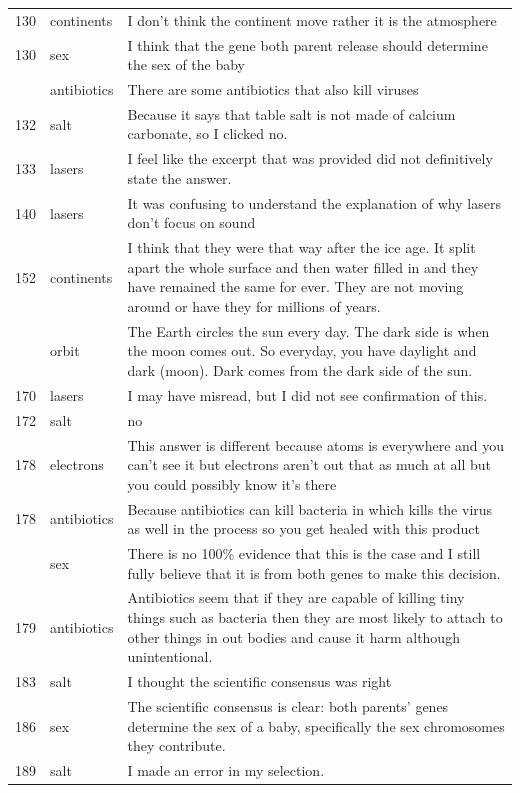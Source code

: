 \documentclass[
  doc,floatsintext]{apa6}
\begin{document}
\begin{longtable}[t]{>{}r>{}l>{\raggedright\arraybackslash}p{30em}}
130 & continents & I don't think the continent move rather it is the atmosphere\\
130 & sex & I think that the gene both parent release should determine the sex of the baby\\
\addlinespace
131 & antibiotics & There are some antibiotics that also kill viruses\\
132 & salt & Because it says that table salt is not made of calcium carbonate, so I clicked no.\\
133 & lasers & I feel like the excerpt that was provided did not definitively state the answer.\\
140 & lasers & It was confusing to understand the explanation of why lasers don’t focus on sound\\
152 & continents & I think that they were that way after the ice age.  It split apart the whole surface and then water filled in and they have remained the same for ever.  They are not moving around or have they for millions of years.\\
\addlinespace
152 & orbit & The  Earth circles the sun every day.  The dark side is when the moon comes out.  So everyday, you have daylight and dark (moon).  Dark comes from the dark side of the sun.\\
170 & lasers & I may have misread, but I did not see confirmation of this.\\
172 & salt & no\\
178 & electrons & This answer is different because atoms is everywhere and you can't see it but electrons aren't out that as much at all but you could possibly know it's there\\
178 & antibiotics & Because antibiotics can kill bacteria in which kills the virus as well in the process so you get healed with this product\\
\addlinespace
178 & sex & There is no 100\% evidence that this is the case and I still fully believe that it is from both genes to make this decision.\\
179 & antibiotics & Antibiotics seem that if they are capable of killing tiny things such as bacteria then they are most likely to attach to other things in out bodies and cause it harm although unintentional.\\
183 & salt & I thought the scientific consensus was right\\
186 & sex & The scientific consensus is clear: both parents' genes determine the sex of a baby, specifically the sex chromosomes they contribute.\\
189 & salt & I made an error in my selection.\\
\bottomrule
\end{longtable}
\end{document}
